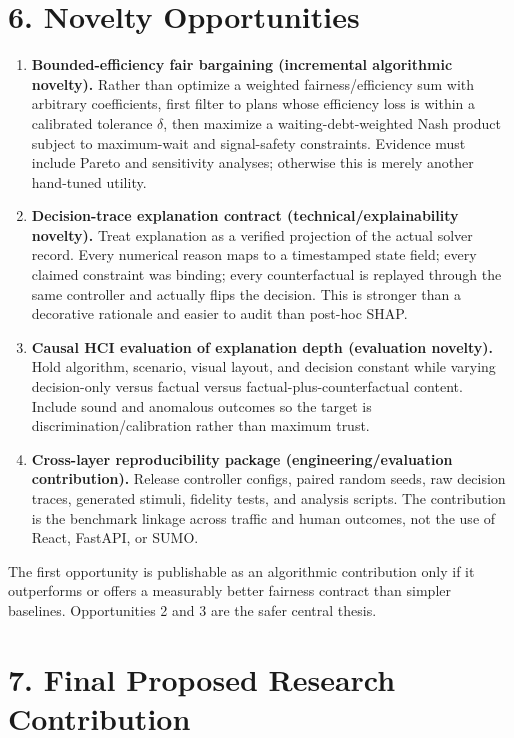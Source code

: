\documentclass[
  english,
  11pt,
  a4paper,
]{article}
\providecommand{\tightlist}{%
  \setlength{\itemsep}{0pt}\setlength{\parskip}{0pt}}
\begin{document}
\section{6. Novelty Opportunities}\label{novelty-opportunities}

\begin{enumerate}
\def\labelenumi{\arabic{enumi}.}
\tightlist
\item
  \textbf{Bounded-efficiency fair bargaining (incremental algorithmic
  novelty).} Rather than optimize a weighted fairness/efficiency sum
  with arbitrary coefficients, first filter to plans whose efficiency
  loss is within a calibrated tolerance \(\delta\), then maximize a
  waiting-debt-weighted Nash product subject to maximum-wait and
  signal-safety constraints. Evidence must include Pareto and
  sensitivity analyses; otherwise this is merely another hand-tuned
  utility.
\item
  \textbf{Decision-trace explanation contract (technical/explainability
  novelty).} Treat explanation as a verified projection of the actual
  solver record. Every numerical reason maps to a timestamped state
  field; every claimed constraint was binding; every counterfactual is
  replayed through the same controller and actually flips the decision.
  This is stronger than a decorative rationale and easier to audit than
  post-hoc SHAP.
\item
  \textbf{Causal HCI evaluation of explanation depth (evaluation
  novelty).} Hold algorithm, scenario, visual layout, and decision
  constant while varying decision-only versus factual versus
  factual-plus-counterfactual content. Include sound and anomalous
  outcomes so the target is discrimination/calibration rather than
  maximum trust.
\item
  \textbf{Cross-layer reproducibility package (engineering/evaluation
  contribution).} Release controller configs, paired random seeds, raw
  decision traces, generated stimuli, fidelity tests, and analysis
  scripts. The contribution is the benchmark linkage across traffic and
  human outcomes, not the use of React, FastAPI, or SUMO.
\end{enumerate}

The first opportunity is publishable as an algorithmic contribution only
if it outperforms or offers a measurably better fairness contract than
simpler baselines. Opportunities 2 and 3 are the safer central thesis.

\section{7. Final Proposed Research
Contribution}\label{final-proposed-research-contribution}
\end{document}

